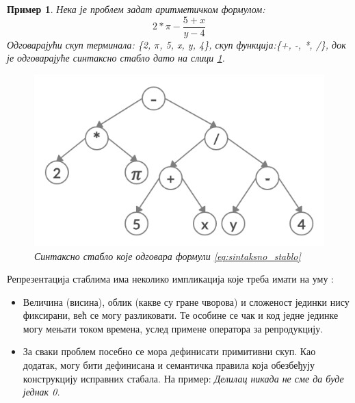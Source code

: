 \documentclass[a4paper]{article}
\newtheorem{primer}{Пример}[section] %
\begin{document}
\begin{primer}
    Нека је проблем задат аритметичком формулом: 
    \begin{equation} 
        \label{eq:sintaksno_stablo}
        2*\pi-\frac{5+x}{y-4}
    \end{equation}
    Одговарајући скуп терминала: \{2, $\pi$, 5, x, y, 4\}, скуп функција:\newline \{+, -, *, /\}, док је одговарајуће синтаксно стабло дато на слици \ref{fig:sintaksno_stablo}.

    \begin{figure}[h!]
        \begin{center}
        \includegraphics[scale=0.22]{sintaksnoStablo.png}
        \end{center}
        \caption{Синтаксно стабло које одговара формули \eqref{eq:sintaksno_stablo}}
        \label{fig:sintaksno_stablo}
    \end{figure}
\end{primer}

\medskip
Репрезентација стаблима има неколико импликација које треба имати на уму \cite{compIntelligence}:
\begin{itemize}
    \item Величина (висина), облик (какве су гране чворова) и сложеност јединки нису фиксирани, већ се могу разликовати. Те особине се чак и код једне јединке могу мењати током времена, услед примене оператора за репродукцију.
    \item За сваки проблем посебно се мора дефинисати примитивни скуп. Као додатак, могу бити дефинисана и семантичка правила која обезбеђују конструкцију исправних стабала. На пример: \newline
    \emph{Делилац никада не сме да буде једнак 0.}
\end{itemize}
\end{document}
